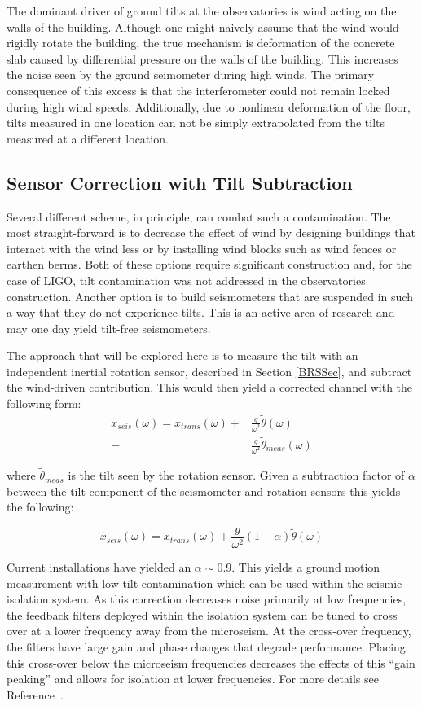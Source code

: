 \documentclass [12pt, proquest]{uwthesis}[2019]
\begin{document}
The dominant driver of ground tilts at the observatories is wind acting on the walls of the building. Although one might naively assume that the wind would rigidly rotate the building, the true mechanism is deformation of the concrete slab caused by differential pressure on the walls of the building. This increases the noise seen by the ground seimometer during high winds. The primary consequence of this excess is that the interferometer could not remain locked during high wind speeds. Additionally, due to nonlinear deformation of the floor, tilts measured in one location can not be simply extrapolated from the tilts measured at a different location.

\subsection{Sensor Correction with Tilt Subtraction}

\quad Several different scheme, in principle, can combat such a contamination. The most straight-forward is to decrease the effect of wind by designing buildings that interact with the wind less or by installing wind blocks such as wind fences or earthen berms. Both of these options require significant construction and, for the case of LIGO, tilt contamination was not addressed in the observatories construction. Another option is to build seismometers that are suspended in such a way that they do not experience tilts. This is an active area of research and may one day yield tilt-free seismometers.~\cite{tiltFree}

The approach that will be explored here is to measure the tilt with an independent inertial rotation sensor, described in Section \ref{BRSSec}, and subtract the wind-driven contribution. This would then yield a corrected channel with the following form:
\begin{align}
\tilde{x}_{seis}(\omega)=\tilde{x}_{trans}(\omega)+&\frac{g}{\omega^2}\tilde{\theta}(\omega)\\
-&\frac{g}{\omega^2}\tilde{\theta}_{meas}(\omega)
\end{align}

where $\tilde{\theta}_{meas}$ is the tilt seen by the rotation sensor. Given a subtraction factor of $\alpha$ between the tilt component of the seismometer and rotation sensors this yields the following:

\[\tilde{x}_{seis}(\omega)=\tilde{x}_{trans}(\omega)+\frac{g}{\omega^2}(1-\alpha)\tilde{\theta}(\omega)\]

Current installations have yielded an $\alpha\sim 0.9$. This yields a ground motion measurement with low tilt contamination which can be used within the seismic isolation system. As this correction decreases noise primarily at low frequencies, the feedback filters deployed within the isolation system can be tuned to cross over at a lower frequency away from the microseism. At the cross-over frequency, the filters have large gain and phase changes that degrade performance. Placing this cross-over below the microseism frequencies decreases the effects of this ``gain peaking'' and allows for isolation at lower frequencies. For more details see Reference~\cite{windproofing}.
\end{document}
